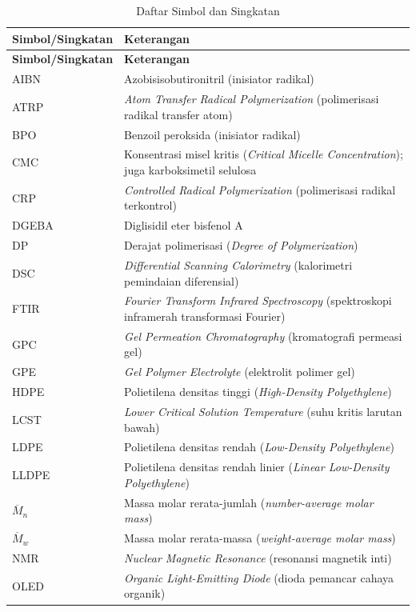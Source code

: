 \documentclass[12pt,a4paper,openany]{book}
\begin{document}
\begin{longtable}{p{3cm}p{9cm}}
\caption{Daftar Simbol dan Singkatan} \\
\toprule
\textbf{Simbol/Singkatan} & \textbf{Keterangan} \\
\midrule
\endfirsthead
\toprule
\textbf{Simbol/Singkatan} & \textbf{Keterangan} \\
\midrule
\endhead
\bottomrule
\endfoot

AIBN & Azobisisobutironitril (inisiator radikal) \\
ATRP & \textit{Atom Transfer Radical Polymerization} (polimerisasi radikal transfer atom) \\
BPO & Benzoil peroksida (inisiator radikal) \\
CMC & Konsentrasi misel kritis (\textit{Critical Micelle Concentration}); juga karboksimetil selulosa \\
CRP & \textit{Controlled Radical Polymerization} (polimerisasi radikal terkontrol) \\
DGEBA & Diglisidil eter bisfenol A \\
DP & Derajat polimerisasi (\textit{Degree of Polymerization}) \\
DSC & \textit{Differential Scanning Calorimetry} (kalorimetri pemindaian diferensial) \\
FTIR & \textit{Fourier Transform Infrared Spectroscopy} (spektroskopi inframerah transformasi Fourier) \\
GPC & \textit{Gel Permeation Chromatography} (kromatografi permeasi gel) \\
GPE & \textit{Gel Polymer Electrolyte} (elektrolit polimer gel) \\
HDPE & Polietilena densitas tinggi (\textit{High-Density Polyethylene}) \\
LCST & \textit{Lower Critical Solution Temperature} (suhu kritis larutan bawah) \\
LDPE & Polietilena densitas rendah (\textit{Low-Density Polyethylene}) \\
LLDPE & Polietilena densitas rendah linier (\textit{Linear Low-Density Polyethylene}) \\
$\overline{M}_n$ & Massa molar rerata-jumlah (\textit{number-average molar mass}) \\
$\overline{M}_w$ & Massa molar rerata-massa (\textit{weight-average molar mass}) \\
NMR & \textit{Nuclear Magnetic Resonance} (resonansi magnetik inti) \\
OLED & \textit{Organic Light-Emitting Diode} (dioda pemancar cahaya organik) \\

\end{longtable}
\end{document}
